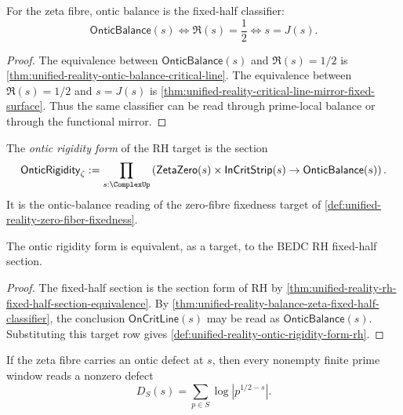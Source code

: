 \begin{theorem}
\label{thm:unified-reality-balance-zeta-fixed-half-classifier}
For the zeta fibre, ontic balance is the fixed-half classifier:
$$
\mathsf{OnticBalance}(s)
\Longleftrightarrow
\Re(s)=\frac12
\Longleftrightarrow
s=J(s).
$$
\end{theorem}

\begin{proof}
The equivalence between $\mathsf{OnticBalance}(s)$ and
$\Re(s)=1/2$ is
\autoref{thm:unified-reality-ontic-balance-critical-line}.  The
equivalence between $\Re(s)=1/2$ and $s=J(s)$ is
\autoref{thm:unified-reality-critical-line-mirror-fixed-surface}.  Thus
the same classifier can be read through prime-local balance or through
the functional mirror.
\end{proof}

\begin{definition}
\label{def:unified-reality-ontic-rigidity-form-rh}
The \emph{ontic rigidity form} of the RH target is the section
$$
\mathsf{OnticRigidity}_{\zeta}
:=
\prod_{s:\ComplexUp}
\left(
\mathsf{ZetaZero}(s)\times\mathsf{InCritStrip}(s)
\to
\mathsf{OnticBalance}(s)
\right).
$$
It is the ontic-balance reading of the zero-fibre fixedness target of
\autoref{def:unified-reality-zero-fiber-fixedness}.
\end{definition}

\begin{theorem}
\label{thm:unified-reality-ontic-rigidity-rh-section-target}
The ontic rigidity form is equivalent, as a target, to the BEDC RH
fixed-half section.
\end{theorem}

\begin{proof}
The fixed-half section is the section form of RH by
\autoref{thm:unified-reality-rh-fixed-half-section-equivalence}.  By
\autoref{thm:unified-reality-balance-zeta-fixed-half-classifier}, the
conclusion $\mathsf{OnCritLine}(s)$ may be read as
$\mathsf{OnticBalance}(s)$.  Substituting this target row gives
\autoref{def:unified-reality-ontic-rigidity-form-rh}.
\end{proof}

\begin{theorem}
\label{thm:unified-reality-defect-visibility-finite-window-read}
If the zeta fibre carries an ontic defect at $s$, then every nonempty
finite prime window reads a nonzero defect
$$
D_S(s)
=
\sum_{p\in S}\log|p^{1/2-s}|.
$$
\end{theorem}

